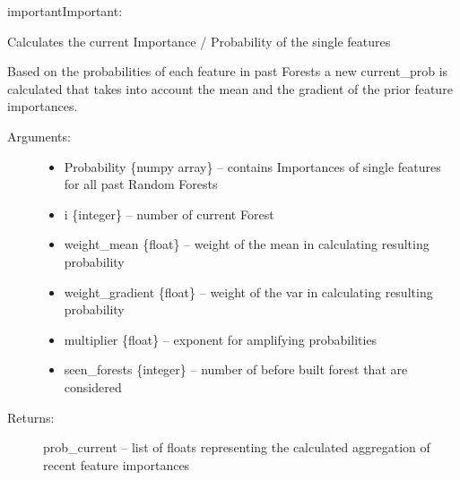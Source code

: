 \documentclass[letterpaper,10pt,english]{sphinxmanual}
\begin{document}
\begin{sphinxadmonition}{important}{Important:}
\begin{fulllineitems}
\end{fulllineitems}

\label{\detokenize{RF:update-prob}}

\begin{fulllineitems}
\label{\detokenize{RF:ForestFire.Main.update_prob}}
Calculates the current Importance / Probability of the single features

Based on the probabilities of each feature in past Forests a new current\_prob is calculated that takes into
account the mean and the gradient of the prior feature importances.
\begin{description}
\item[{Arguments:}] \leavevmode\begin{itemize}
\item {} 
Probability \{numpy array\} -- contains Importances of single features for all past Random Forests

\item {} 
i \{integer\} -- number of current Forest

\item {} 
weight\_mean \{float\} -- weight of the mean in calculating resulting probability

\item {} 
weight\_gradient \{float\} -- weight of the var in calculating resulting probability

\item {} 
multiplier \{float\} -- exponent for amplifying probabilities

\item {} 
seen\_forests \{integer\} -- number of before built forest that are considered

\end{itemize}

\item[{Returns:}] \leavevmode
prob\_current -- list of floats representing the calculated aggregation of recent feature importances

\end{description}

\end{fulllineitems}

\label{\detokenize{RF:forest-predict}}


\end{sphinxadmonition}
\end{document}
